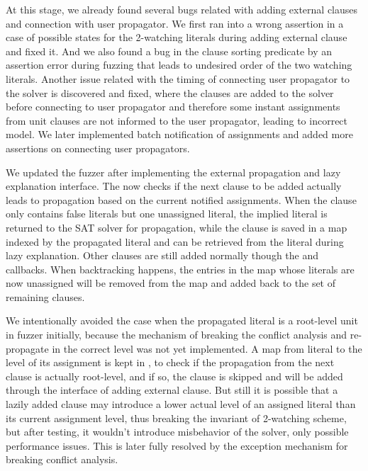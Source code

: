 At this stage, we already found several bugs related with adding external clauses and connection with user propagator. We first ran into a wrong assertion in a case of possible states for the 2-watching literals during adding external clause and fixed it. And we also found a bug in the clause sorting predicate by an assertion error during fuzzing that leads to undesired order of the two watching literals. Another issue related with the timing of connecting user propagator to the solver is discovered and fixed, where the clauses are added to the solver before connecting to user propagator and therefore some instant assignments from unit clauses are not informed to the user propagator, leading to incorrect model. We later implemented batch notification of assignments and added more assertions on connecting user propagators.

We updated the fuzzer after implementing the external propagation and lazy explanation interface. The  now checks if the next clause to be added actually leads to propagation based on the current notified assignments. When the clause only contains false literals but one unassigned literal, the implied literal is returned to the SAT solver for propagation, while the clause is saved in a map indexed by the propagated literal and can be retrieved from the literal during lazy explanation. Other clauses are still added normally though the  and  callbacks. When backtracking happens, the entries in the map whose literals are now unassigned will be removed from the map and added back to the set of remaining clauses.

We intentionally avoided the case when the propagated literal is a root-level unit in fuzzer initially, because the mechanism of breaking the conflict analysis and re-propagate in the correct level was not yet implemented. A map from literal to the level of its assignment is kept in , to check if the propagation from the next clause is actually root-level, and if so, the clause is skipped and will be added through the interface of adding external clause. But still it is possible that a lazily added clause may introduce a lower actual level of an assigned literal than its current assignment level, thus breaking the invariant of 2-watching scheme, but after testing, it wouldn't introduce misbehavior of the solver, only possible performance issues. This is later fully resolved by the exception mechanism for breaking conflict analysis.


